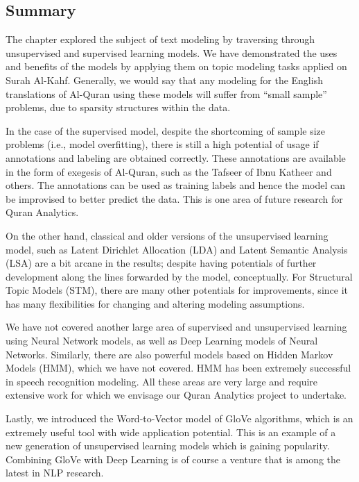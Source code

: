 \documentclass[
]{article}
\begin{document}
\hypertarget{summary-chapter-8}{%
\subsection{Summary}\label{summary-chapter-8}}

The chapter explored the subject of text modeling by traversing through unsupervised and supervised learning models. We have demonstrated the uses and benefits of the models by applying them on topic modeling tasks applied on Surah Al-Kahf. Generally, we would say that any modeling for the English translations of Al-Quran using these models will suffer from ``small sample'' problems, due to sparsity structures within the data.

In the case of the supervised model, despite the shortcoming of sample size problems (i.e., model overfitting), there is still a high potential of usage if annotations and labeling are obtained correctly. These annotations are available in the form of exegesis of Al-Quran, such as the Tafseer of Ibnu Katheer and others. The annotations can be used as training labels and hence the model can be improvised to better predict the data. This is one area of future research for Quran Analytics.

On the other hand, classical and older versions of the unsupervised learning model, such as Latent Dirichlet Allocation (LDA) and Latent Semantic Analysis (LSA) are a bit arcane in the results; despite having potentials of further development along the lines forwarded by the model, conceptually. For Structural Topic Models (STM), there are many other potentials for improvements, since it has many flexibilities for changing and altering modeling assumptions.

We have not covered another large area of supervised and unsupervised learning using Neural Network models, as well as Deep Learning models of Neural Networks. Similarly, there are also powerful models based on Hidden Markov Models (HMM), which we have not covered. HMM has been extremely successful in speech recognition modeling. All these areas are very large and require extensive work for which we envisage our Quran Analytics project to undertake.

Lastly, we introduced the Word-to-Vector model of GloVe algorithms, which is an extremely useful tool with wide application potential. This is an example of a new generation of unsupervised learning models which is gaining popularity. Combining GloVe with Deep Learning is of course a venture that is among the latest in NLP research.
\end{document}
